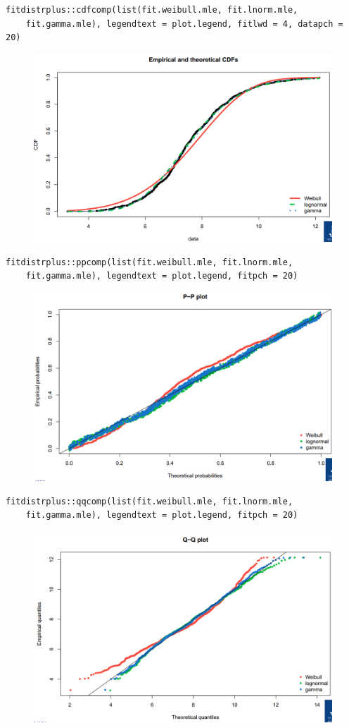 \documentclass[11pt]{article}
\begin{document}
\begin{lstlisting}
fitdistrplus::cdfcomp(list(fit.weibull.mle, fit.lnorm.mle,
    fit.gamma.mle), legendtext = plot.legend, fitlwd = 4, datapch = 20)
\end{lstlisting}
\begin{figure}[H]
    \centering
    \includegraphics[width=0.7\linewidth]{SUVA - GOF - Emp and Theo CDF's.png}
\end{figure}

\begin{lstlisting}
fitdistrplus::ppcomp(list(fit.weibull.mle, fit.lnorm.mle,
    fit.gamma.mle), legendtext = plot.legend, fitpch = 20)
\end{lstlisting}
\begin{figure}[H]
    \centering
    \includegraphics[width=0.7\linewidth]{SUVA - GOF - pp plot.png}
\end{figure}

\begin{lstlisting}
fitdistrplus::qqcomp(list(fit.weibull.mle, fit.lnorm.mle,
    fit.gamma.mle), legendtext = plot.legend, fitpch = 20)
\end{lstlisting}
\begin{figure}[H]
    \centering
    \includegraphics[width=0.7\linewidth]{SUVA - GOF - qq plot.png}
\end{figure}
\end{document}
